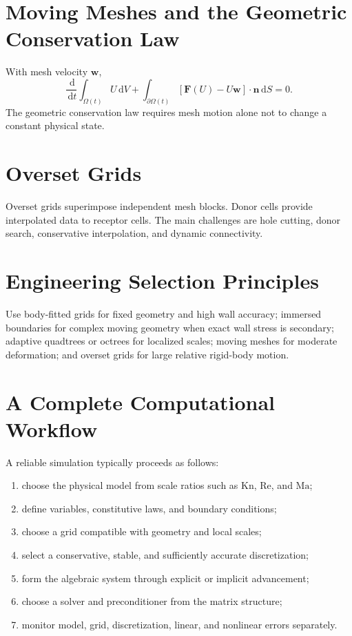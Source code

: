 \documentclass[11pt,openany]{book}
\newcommand{\dd}{\,\mathrm d}
\begin{document}
\chapter*{Moving Meshes and the Geometric Conservation Law}
With mesh velocity $\bm w$,
\[
\frac{\dd}{\dd t}\int_{\Omega(t)}U\dd V+\int_{\partial\Omega(t)}[\bm F(U)-U\bm w]\cdot\bm n\dd S=0.
\]
The geometric conservation law requires mesh motion alone not to change a constant physical state.

\chapter*{Overset Grids}
Overset grids superimpose independent mesh blocks. Donor cells provide interpolated data to receptor cells. The main challenges are hole cutting, donor search, conservative interpolation, and dynamic connectivity.

\chapter*{Engineering Selection Principles}
Use body-fitted grids for fixed geometry and high wall accuracy; immersed boundaries for complex moving geometry when exact wall stress is secondary; adaptive quadtrees or octrees for localized scales; moving meshes for moderate deformation; and overset grids for large relative rigid-body motion.

\chapter*{A Complete Computational Workflow}
A reliable simulation typically proceeds as follows:
\begin{enumerate}
\item choose the physical model from scale ratios such as $\mathrm{Kn}$, $\mathrm{Re}$, and $\mathrm{Ma}$;
\item define variables, constitutive laws, and boundary conditions;
\item choose a grid compatible with geometry and local scales;
\item select a conservative, stable, and sufficiently accurate discretization;
\item form the algebraic system through explicit or implicit advancement;
\item choose a solver and preconditioner from the matrix structure;
\item monitor model, grid, discretization, linear, and nonlinear errors separately.
\end{enumerate}
\end{document}
